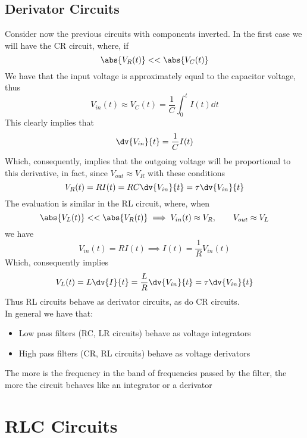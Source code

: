 \documentclass[../electromagnetism.tex]{subfiles}
\begin{document}
\subsection{Derivator Circuits}
Consider now the previous circuits with components inverted. In the first case we will have the CR circuit, where, if 
\begin{equation*}
	\abs{V_R(t)}<<\abs{V_C(t)}
\end{equation*}
We have that the input voltage is approximately equal to the capacitor voltage, thus
\begin{equation*}
	V_{in}(t)\approx V_C(t)=\frac{1}{C}\int_{0}^{t}I(t)\dd^{}{t}
\end{equation*}
This clearly implies that
\begin{equation*}
	\dv{V_{in}}{t}=\frac{1}{C}I(t)
\end{equation*}
Which, consequently, implies that the outgoing voltage will be proportional to this derivative, in fact, since $V_{out}\approx V_R$ with these conditions
\begin{equation}
	V_R(t)=RI(t)=RC\dv{V_{in}}{t}=\tau\dv{V_{in}}{t}
	\label{eq:croutput.der}
\end{equation}
The evaluation is similar in the RL circuit, where, when
\begin{equation*}
	\abs{V_L(t)}<<\abs{V_R(t)}\implies V_{in}(t)\approx V_R, \qquad V_{out}\approx V_L
\end{equation*}
we have
\begin{equation*}
	V_{in}(t)=RI(t)\implies I(t)=\frac{1}{R}V_{in}(t)
\end{equation*}
Which, consequently implies
\begin{equation}
	V_{L}(t)=L\dv{I}{t}=\frac{L}{R}\dv{V_{in}}{t}=\tau\dv{V_{in}}{t}
	\label{eq:lroutput.der}
\end{equation}
Thus RL circuits behave as derivator circuits, as do CR circuits.\\
In general we have that:
\begin{itemize}
\item Low pass filters (RC, LR circuits) behave as voltage integrators
\item High pass filters (CR, RL circuits) behave as voltage derivators
\end{itemize}
The more is the frequency in the band of frequencies passed by the filter, the more the circuit behaves like an integrator or a derivator
\section{RLC Circuits}
\end{document}
